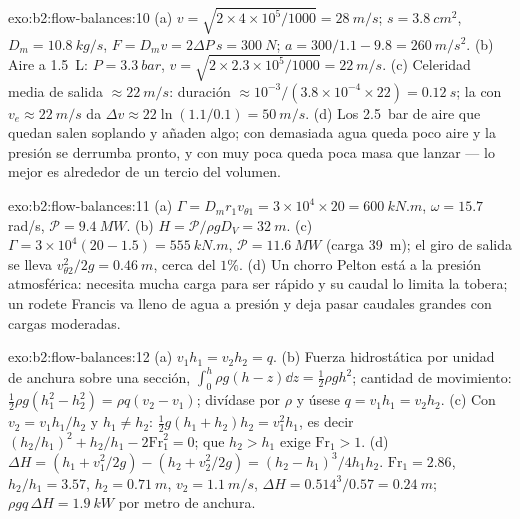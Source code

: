 \begin{solution}{exo:b2:flow-balances:10}
(a) $v = \sqrt{2 \times 4 \times 10^5/1000} = \qty{28}{m/s}$; $s = \qty{3.8}{cm^2}$, $D_m =
\qty{10.8}{kg/s}$, $F = D_mv = 2\Delta P\,s = \qty{300}{N}$; $a = 300/1.1 - 9.8 =
\qty{260}{m/s^2}$. (b) Aire a \qty{1.5}{L}: $P = \qty{3.3}{bar}$, $v = \sqrt{2 \times 2.3 \times
10^5/1000} = \qty{22}{m/s}$. (c) Celeridad media de salida $\approx \qty{22}{m/s}$: duración $\approx 10^{-3}
/(3.8 \times 10^{-4} \times 22) = \qty{0.12}{s}$; la  con $v_e \approx \qty{22}{m/s}$ da
$\Delta v \approx 22\ln(1.1/0.1) = \qty{50}{m/s}$. (d) Los \qty{2.5}{bar} de aire que quedan
salen soplando y añaden algo; con demasiada agua queda poco aire y la
presión se derrumba pronto, y con muy poca queda poca masa que lanzar ---
lo mejor es alrededor de un tercio del volumen.
\end{solution}

\begin{solution}{exo:b2:flow-balances:11}
(a) $\Gamma = D_mr_1v_{\theta1} = 3 \times 10^4 \times 20 = \qty{600}{kN.m}$, $\omega = 15.7$ rad/s,
$\mathcal P = \qty{9.4}{MW}$. (b) $H = \mathcal P/\rho gD_V = \qty{32}{m}$. (c) $\Gamma = 3 \times
10^4(20 - 1.5) = \qty{555}{kN.m}$, $\mathcal P = \qty{11.6}{MW}$ (carga \qty{39}{m}); el
giro de salida se lleva $v_{\theta2}^2/2g = \qty{0.46}{m}$, cerca del $1\%$. (d) Un chorro Pelton
está a la presión atmosférica: necesita mucha carga para ser rápido y su
caudal lo limita la tobera; un rodete Francis va lleno de agua a presión y
deja pasar caudales grandes con cargas moderadas.
\end{solution}

\begin{solution}{exo:b2:flow-balances:12}
(a) $v_1h_1 = v_2h_2 = q$. (b) Fuerza hidrostática por unidad de anchura sobre una
sección, $\int_0^h\rho g(h - z)\dd z = \tfrac12\rho gh^2$; cantidad de movimiento: $\tfrac12\rho g(h_1^2
- h_2^2) = \rho q(v_2 - v_1)$; divídase por $\rho$ y úsese $q = v_1h_1 = v_2h_2$.
(c) Con $v_2 = v_1h_1/h_2$ y $h_1 \ne h_2$: $\tfrac12g(h_1 + h_2)h_2 = v_1^2h_1$,
es decir $(h_2/h_1)^2 + h_2/h_1 - 2\mathrm{Fr}_1^2 = 0$; que $h_2 > h_1$ exige $\mathrm{Fr}_1 > 1$.
(d) $\Delta H = (h_1 + v_1^2/2g) - (h_2 + v_2^2/2g) = (h_2 - h_1)^3/4h_1h_2$.
$\mathrm{Fr}_1 = 2.86$, $h_2/h_1 = 3.57$, $h_2 = \qty{0.71}{m}$, $v_2 = \qty{1.1}{m/s}$,
$\Delta H = 0.514^3/0.57 = \qty{0.24}{m}$; $\rho gq\,\Delta H = \qty{1.9}{kW}$ por metro de anchura.
\end{solution}

